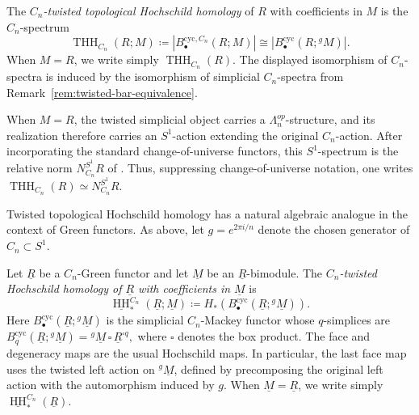 \documentclass[11pt,oneside]{amsart}
\DeclareMathOperator{\THH}{THH}
\DeclareMathOperator{\HH}{HH}
\numberwithin{equation}{section}
\numberwithin{figure}{section}
\theoremstyle{plain}
\theoremstyle{definition}
\theoremstyle{remark}
\begin{document}
\begin{definition}
\label{def:twisted-THH-coeff}
The \emph{\(C_n\)-twisted topological Hochschild homology} of \(R\)
with coefficients in \(M\) is the \(C_n\)-spectrum
\begin{equation}\label{eq:twisted-thh-cyc-realization}
\THH_{C_n}(R;M)
\coloneqq
\left|B^{\mathrm{cyc},C_n}_\bullet(R;M)\right|
\cong
\left|B^{\mathrm{cyc}}_\bullet(R;{}^gM)\right|.
\end{equation}
When \(M=R\), we write simply \(\THH_{C_n}(R)\).
The displayed isomorphism of \(C_n\)-spectra is induced by the
isomorphism of simplicial \(C_n\)-spectra from
Remark~\ref{rem:twisted-bar-equivalence}.
\end{definition}

\begin{remark}
When \(M=R\), the twisted simplicial object carries a
\(\Lambda_n^{op}\)-structure, and its realization therefore carries
an \(S^1\)-action extending the original \(C_n\)-action. After
incorporating the standard change-of-universe functors, this
\(S^1\)-spectrum is the relative norm
\(
N_{C_n}^{S^1}R
\)
of \cite[Def.~8.2]{ABGHLM}. Thus, suppressing change-of-universe
notation, one writes
\(
\THH_{C_n}(R)\simeq N_{C_n}^{S^1}R.
\)
\end{remark}




Twisted topological Hochschild homology has a natural algebraic
analogue in the context of Green functors. As above, let
\(g=e^{2\pi i/n}\) denote the chosen generator of
\(C_n\subset S^1\).

\begin{definition}
\label{def:twisted-HH-Green}
Let \(\underline R\) be a \(C_n\)-Green functor and let
\(\underline M\) be an \(\underline R\)-bimodule. The
\emph{\(C_n\)-twisted Hochschild homology of \(\underline R\) with
coefficients in \(\underline M\)} is
\[
\underline{\HH}^{C_n}_*
(\underline R;\underline M)
\coloneqq
H_*\!\left(
B^{\mathrm{cyc}}_\bullet
(\underline R;{}^g\underline M)
\right).
\]
Here \(B^{\mathrm{cyc}}_\bullet
(\underline R;{}^g\underline M)\) is the simplicial \(C_n\)-Mackey
functor whose \(q\)-simplices are
\(
B^{\mathrm{cyc}}_q
(\underline R;{}^g\underline M)
=
{}^g\underline M
\,\square\,
\underline R^{\square q},
\)
where \(\square\) denotes the box product. The face and degeneracy
maps are the usual Hochschild maps. In particular, the last face map
uses the twisted left action on \({}^g\underline M\), defined by
precomposing the original left action with the automorphism induced
by \(g\). When \(\underline M=\underline R\), we write simply
\(\underline{\HH}^{C_n}_*(\underline R)\).
\end{definition}
\end{document}
